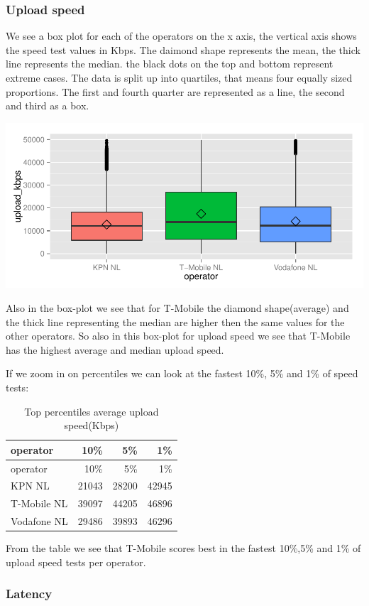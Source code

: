 \documentclass[]{article}
\begin{document}
\subsubsection{Upload speed}\label{upload-speed-1}

We see a box plot for each of the operators on the x axis, the vertical
axis shows the speed test values in Kbps. The daimond shape represents
the mean, the thick line represents the median. the black dots on the
top and bottom represent extreme cases. The data is split up into
quartiles, that means four equally sized proportions. The first and
fourth quarter are represented as a line, the second and third as a box.

\includegraphics{speedtest-analysis_files/figure-latex/box-up-1.pdf}

Also in the box-plot we see that for T-Mobile the diamond shape(average)
and the thick line representing the median are higher then the same
values for the other operators. So also in this box-plot for upload
speed we see that T-Mobile has the highest average and median upload
speed.

If we zoom in on percentiles we can look at the fastest 10\%, 5\% and
1\% of speed tests:

\begin{longtable}[c]{@{}lrrr@{}}
\caption{Top percentiles average upload speed(Kbps)}\tabularnewline
\toprule
operator & 10\% & 5\% & 1\%\tabularnewline
\midrule
\endfirsthead
\toprule
operator & 10\% & 5\% & 1\%\tabularnewline
\midrule
\endhead
KPN NL & 21043 & 28200 & 42945\tabularnewline
T-Mobile NL & 39097 & 44205 & 46896\tabularnewline
Vodafone NL & 29486 & 39893 & 46296\tabularnewline
\bottomrule
\end{longtable}

From the table we see that T-Mobile scores best in the fastest 10\%,5\%
and 1\% of upload speed tests per operator.

\subsubsection{Latency}\label{latency-1}
\end{document}
